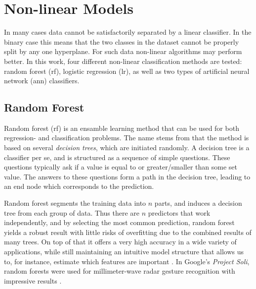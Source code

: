 \section{Non-linear Models}
In many cases data cannot be satisfactorily separated by a linear classifier. In the binary case this means that the two classes in the dataset cannot be properly split by any one hyperplane. For such data non-linear algorithms may perform better. In this work, four different non-linear classification methods are tested: random forest (\gls{rf}), logistic regression (\gls{lr}), as well as two types of artificial neural network (\gls{ann}) classifiers. 



\subsection{Random Forest}
Random forest (\gls{rf}) is an ensamble learning method that can be used for both regression- and classification problems. The name stems from that the method is based on several \textit{decision trees}, which are initiated randomly. A decision tree is a classifier per se, and is structured as a sequence of simple questions. These questions typically ask if a value is equal to or greater/smaller than some set value. The answers to these questions form a path in the decision tree, leading to an end node which corresponds to the prediction.

Random forest segments the training data into $n$ parts, and induces a decision tree from each group of data. Thus there are $n$ predictors that work independently, and by selecting the most common prediction, random forest yields a robust result with little risks of overfitting due to the combined results of many trees. On top of that it offers a very high accuracy in a wide variety of applications, while still maintaining an intuitive model structure that allows us to, for instance, estimate which features are important \citep{breiman_2002}. In Google's \emph{Project Soli}, random forests were used for millimeter-wave radar gesture recognition with impressive results \citep{lien_gillian_karagozler_amihood_schwesig_olson_raja_poupyrev_2016}. 

